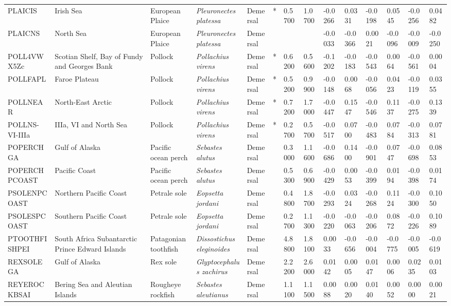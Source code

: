 \begin{longtable}{p{2.8cm}p{2cm}p{1.7cm}p{1.7cm}p{1cm}p{0.3cm}p{1cm}p{1cm}p{1cm}p{1cm}p{1cm}p{1cm}p{1cm}p{1cm}}
  PLAICIS & Irish Sea & European Plaice & \textit{Pleuronectes platessa} & Demersal & * & 0.5700 & 1.0700 & -0.0266 & 0.0331 & -0.0198 & 0.0545 & -0.0256 & 0.0482 \\ 
  PLAICNS & North Sea & European Plaice & \textit{Pleuronectes platessa} & Demersal &  &  &  & -0.0033 & -0.0366 & 0.0021 & -0.0096 & -0.0009 & -0.0250 \\ 
  POLL4VWX5Zc & Scotian Shelf, Bay of Fundy and Georges Bank & Pollock & \textit{Pollachius virens} & Demersal & * & 0.6200 & 0.5600 & -0.1202 & -0.0183 & -0.0543 & 0.0064 & -0.0561 & 0.0004 \\ 
  POLLFAPL & Faroe Plateau & Pollock & \textit{Pollachius virens} & Demersal & * & 0.5200 & 0.9900 & -0.0148 & 0.0068 & -0.0056 & 0.0423 & -0.0119 & 0.0355 \\ 
  POLLNEAR & North-East Arctic & Pollock & \textit{Pollachius virens} & Demersal & * & 0.7200 & 1.7000 & -0.0447 & 0.1547 & -0.0546 & 0.1137 & -0.0275 & 0.1339 \\ 
  POLLNS-VI-IIIa & IIIa, VI and North Sea & Pollock & \textit{Pollachius virens} & Demersal & * & 0.2700 & 0.5700 & -0.0517 & 0.0700 & -0.0483 & 0.0784 & -0.0313 & 0.0781 \\ 
  POPERCHGA & Gulf of Alaska & Pacific ocean perch & \textit{Sebastes alutus} & Demersal &   & 0.3000 & 1.1600 & -0.0686 & 0.1400 & -0.0901 & 0.0747 & -0.0698 & 0.0853 \\ 
  POPERCHPCOAST & Pacific Coast & Pacific ocean perch & \textit{Sebastes alutus} & Demersal &   & 0.5300 & 0.6900 & -0.0429 & 0.0053 & -0.0399 & 0.0194 & -0.0398 & 0.0174 \\ 
  PSOLENPCOAST & Northern Pacific Coast & Petrale sole & \textit{Eopsetta jordani} & Demersal &   & 0.4800 & 1.8700 & -0.0293 & 0.0324 & -0.0268 & 0.1124 & -0.0300 & 0.1050 \\ 
  PSOLESPCOAST & Southern Pacific Coast & Petrale sole & \textit{Eopsetta jordani} & Demersal &   & 0.2700 & 1.1300 & -0.0220 & -0.0063 & -0.0206 & 0.0872 & -0.0226 & 0.1089 \\ 
  PTOOTHFISHPEI & South Africa Subantarctic Prince Edward Islands & Patagonian toothfish & \textit{Dissostichus eleginoides} & Demersal &   & 4.8800 & 1.8100 & 0.0033 & -0.0656 & -0.0004 & -0.0775 & -0.0005 & -0.0619 \\ 
  REXSOLEGA & Gulf of Alaska & Rex sole & \textit{Glyptocephalus zachirus} & Demersal &   & 2.2200 & 2.6000 & 0.0142 & 0.0005 & 0.0147 & 0.0006 & 0.0235 & 0.0103 \\ 
  REYEROCKBSAI & Bering Sea and Aleutian Islands & Rougheye rockfish & \textit{Sebastes aleutianus} & Demersal &   & 1.1100 & 1.1500 & 0.0088 & 0.0020 & 0.0140 & 0.0052 & 0.0000 & 0.0021 \\ 

\end{longtable}
